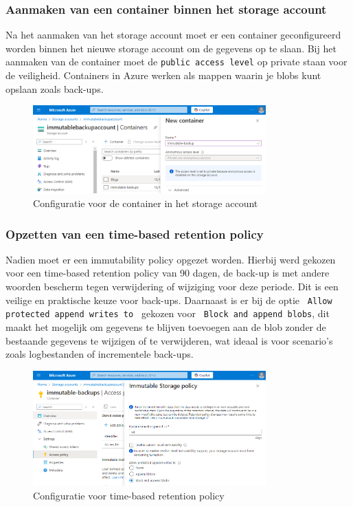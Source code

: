 \subsubsection{Aanmaken van een container binnen het storage account}
Na het aanmaken van het storage account moet er een container geconfigureerd worden binnen het nieuwe storage account om de gegevens op te slaan. Bij het aanmaken van de container moet de \texttt{public access level} op private staan voor de veiligheid. Containers in Azure werken als mappen waarin je blobs kunt opslaan zoals back-ups.
\begin{figure}[h]
    \centering
    \captionsetup{justification=centering}    
    \includegraphics[width=0.8\textwidth]{img/4imm.png}
    \caption{Configuratie voor de container in het storage account}
\end{figure}
\subsubsection{Opzetten van een time-based retention policy}
Nadien moet er een immutability policy opgezet worden. Hierbij werd gekozen voor een time-based retention policy van 90 dagen, de back-up is met andere woorden bescherm tegen verwijdering of wijziging voor deze periode. Dit is een veilige en praktische keuze voor back-ups. Daarnaast is er bij de optie \texttt{ Allow protected append writes to } gekozen voor \texttt{ Block and append blobs}, dit maakt het mogelijk om gegevens te blijven toevoegen aan de blob zonder de bestaande gegevens te wijzigen of te verwijderen, wat ideaal is voor scenario's zoals logbestanden of incrementele back-ups.
\begin{figure}[h]
    \centering
    \captionsetup{justification=centering}    
    \includegraphics[width=0.8\textwidth]{img/6imm.png}
    \caption{Configuratie voor time-based retention policy}
\end{figure}
\newpage
